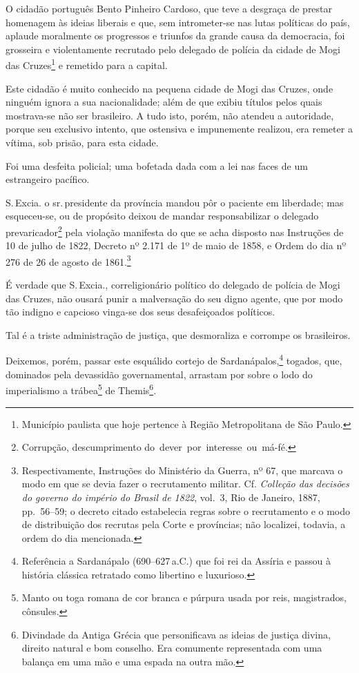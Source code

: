 O cidadão português Bento Pinheiro Cardoso, que teve a desgraça de
prestar homenagem às ideias liberais e que, sem intrometer-se nas lutas
políticas do país, aplaude moralmente os progressos e triunfos da grande
causa da democracia, foi grosseira e violentamente recrutado pelo
delegado de polícia da cidade de Mogi das Cruzes\footnote{Município
  paulista que hoje pertence à Região Metropolitana de São Paulo.} e
remetido para a capital.

Este cidadão é muito conhecido na pequena cidade de Mogi das Cruzes,
onde ninguém ignora a sua nacionalidade; além de que exibiu títulos
pelos quais mostrava-se não ser brasileiro. A tudo isto, porém, não
atendeu a autoridade, porque seu exclusivo intento, que ostensiva e
impunemente realizou, era remeter a vítima, sob prisão, para esta
cidade.

Foi uma desfeita policial; uma bofetada dada com a lei nas faces de um
estrangeiro pacífico.

S.\,Excia. o sr.\,presidente da província mandou pôr o paciente em
liberdade; mas esqueceu-se, ou de propósito deixou de mandar
responsabilizar o delegado prevaricador\footnote{Corrupção,
  descumprimento do~dever~por~interesse~ou~má-fé.} pela violação
manifesta do que se acha disposto nas Instruções de 10 de julho de 1822,
Decreto nº 2.171 de 1º de maio de 1858, e Ordem do dia nº 276 de 26 de
agosto de 1861.\footnote{Respectivamente, Instruções do Ministério da
  Guerra, nº 67, que marcava o modo em que se devia fazer o recrutamento
  militar. Cf. \emph{Colleção das decisões do governo do império do
  Brasil de 1822}, vol.~3, Rio de Janeiro, 1887, pp.~56--59; o decreto
  citado estabelecia regras sobre o recrutamento e o modo de
  distribuição dos recrutas pela Corte e províncias; não localizei,
  todavia, a ordem do dia mencionada.}

É verdade que S.\,Excia., correligionário político do delegado de polícia
de Mogi das Cruzes, não ousará punir a malversação do seu digno agente,
que por modo tão indigno e capcioso vinga-se dos seus desafeiçoados
políticos.

Tal é a triste administração de justiça, que desmoraliza e corrompe os
brasileiros.

Deixemos, porém, passar este esquálido cortejo de
Sardanápalos,\footnote{Referência a Sardanápalo (690--627\,a.C.) que
  foi rei da Assíria e passou à história clássica retratado como
  libertino e luxurioso.} togados, que, dominados pela devassidão
governamental, arrastam por sobre o lodo do imperialismo a
trábea\footnote{Manto ou toga romana de cor branca e púrpura usada por
  reis, magistrados, cônsules.} de Themis\footnote{Divindade da Antiga
  Grécia que personificava as ideias de justiça divina, direito natural
  e bom conselho. Era comumente representada com uma balança em uma mão
  e uma espada na outra mão.}.


